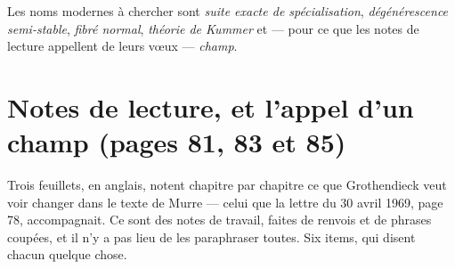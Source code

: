 \documentclass[11pt,a4paper]{article}
\begin{document}
\begin{resume}
Les noms modernes à chercher sont \emph{suite exacte de spécialisation},
\emph{dégénérescence semi-stable}, \emph{fibré normal}, \emph{théorie de
Kummer} et --- pour ce que les notes de lecture appellent de leurs vœux ---
\emph{champ}.

\end{resume}

\section*{Notes de lecture, et l'appel d'un champ (pages 81, 83 et 85)}

Trois feuillets, en anglais, notent chapitre par chapitre ce que Grothendieck
veut voir changer dans le texte de Murre --- celui que la lettre du 30 avril
1969, page 78, accompagnait. Ce sont des notes de travail, faites de renvois et
de phrases coupées, et il n'y a pas lieu de les paraphraser toutes. Six items,
qui disent chacun quelque chose.
\end{document}
